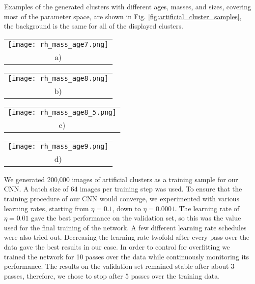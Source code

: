 \documentclass{aa}
\begin{document}
Examples of the generated clusters with different ages, masses, and sizes, covering most of the parameter space, are shown in Fig. \ref{fig:artificial_cluster_samples}, the background is the same for all of the displayed clusters.

\begin{figure*}
    \centering
    \begin{tabular}{@{}c@{}}
        \texttt{[image: rh\_mass\_age7.png]} \\[0.5 pt]
        \small a)
    \end{tabular}
    \begin{tabular}{@{}c@{}}
        \texttt{[image: rh\_mass\_age8.png]} \\[0.5 pt]
        \small b)
    \end{tabular}
    \begin{tabular}{@{}c@{}}
        \texttt{[image: rh\_mass\_age8\_5.png]} \\[0.5 pt]
        \small c)
    \end{tabular}
    \begin{tabular}{@{}c@{}}
        \texttt{[image: rh\_mass\_age9.png]} \\[0.5 pt]
        \small d)
    \end{tabular}
    \caption{Examples of generated clusters on a real background image. The ages of all of the displayed clusters are: a) $\log(t/{\rm yr})=7.0$, b) 8.0, c) 8.5, d) 9.0. The masses and $r_h$ values are varied as shown on the axes. The intensity scale of the images was normalized with the arcsinh function. The background is the same for all of the displayed clusters for clarity.}
    \label{fig:artificial_cluster_samples}
\end{figure*}

We generated 200,000 images of artificial clusters as a training sample for our CNN. A batch size of 64 images per training step was used. To ensure that the training procedure of our CNN would converge, we experimented with various learning rates, starting from $\eta=0.1$, down to $\eta=0.0001$. The learning rate of $\eta=0.01$ gave the best performance on the validation set, so this was the value used for the final training of the network. A few different learning rate schedules were also tried out. Decreasing the learning rate twofold after every pass over the data gave the best results in our case. In order to control for overfitting we trained the network for 10 passes over the data while continuously monitoring its performance. The results on the validation set remained stable after about 3 passes, therefore, we chose to stop after 5 passes over the training data.
\end{document}
